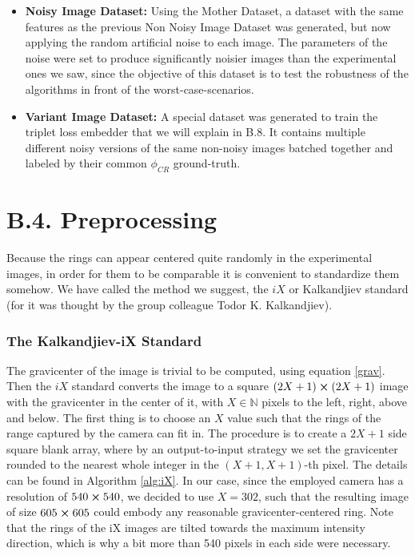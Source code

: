 \documentclass[11pt, a4paper, twoside]{article} %
\newcommand{\N}{\mathbb{N}}
\begin{document}
\begin{itemize}
\item {\bf Noisy Image Dataset:} Using the Mother Dataset, a dataset with the same features as the previous Non Noisy Image Dataset was generated, but now applying the random artificial noise to each image. The parameters of the noise were set to produce significantly noisier images than the experimental ones we saw, since the objective of this dataset is to test the robustness of the algorithms in front of the worst-case-scenarios.

\item {\bf Variant Image Dataset:} A special dataset was generated to train the triplet loss embedder that we will explain in B.8. It contains multiple different noisy versions of the same non-noisy images batched together and labeled by their common $\phi_{CR}$ ground-truth.
\end{itemize}
\newpage
\section*{B.4. Preprocessing }\vspace{-0.3cm}
Because the rings can appear centered quite randomly in the experimental images, in order for them to be comparable it is convenient to standardize them somehow. We have called the method we suggest, the $iX$ or Kalkandjiev standard (for it was thought by the group colleague Todor K. Kalkandjiev).\vspace{-0.3cm}
\subsubsection*{The Kalkandjiev-iX Standard\vspace{-0.3cm}}
The gravicenter of the image is trivial to be computed, using equation \eqref{grav}. Then the $iX$ standard converts the image to a square $(2X+1)\cross(2X+1)$ image with the gravicenter in the center of it, with $X\in\N$ pixels to the left, right, above and below. The first thing is to choose an $X$ value such that the rings of the range captured by the camera can fit in. The procedure is to create a $2X+1$ side square blank array, where by an output-to-input strategy we set the gravicenter rounded to the nearest whole integer in the $(X+1,X+1)$-th pixel. The details can be found in Algorithm \ref{alg:iX}. In our case, since the employed camera has a resolution of $540\cross 540$, we decided to use $X=302$, such that the resulting image of size $605\cross 605$ could embody any reasonable gravicenter-centered ring. Note that the rings of the iX images are tilted towards the maximum intensity direction, which is why a bit more than 540 pixels in each side were necessary.
\end{document}
